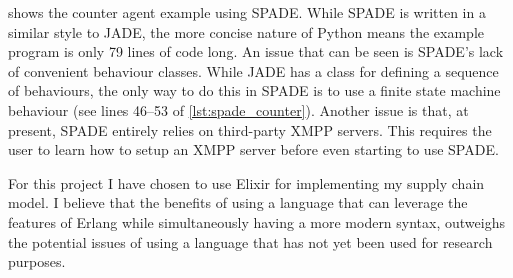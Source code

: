  shows the counter agent example using SPADE\@.
While SPADE is written in a similar style to JADE, the more concise nature of Python means the example program is only 79 lines of code long.
An issue that can be seen is SPADE's lack of convenient behaviour classes.
While JADE has a class for defining a sequence of behaviours, the only way to do this in SPADE is to use a finite state machine behaviour (see lines 46--53 of \cref{lst:spade_counter}).
Another issue is that, at present, SPADE entirely relies on third-party XMPP servers.
This requires the user to learn how to setup an XMPP server before even starting to use SPADE\@.

For this project I have chosen to use Elixir for implementing my supply chain model.
I believe that the benefits of using a language that can leverage the features of Erlang while simultaneously having a more modern syntax, outweighs the potential issues of using a language that has not yet been used for research purposes.
